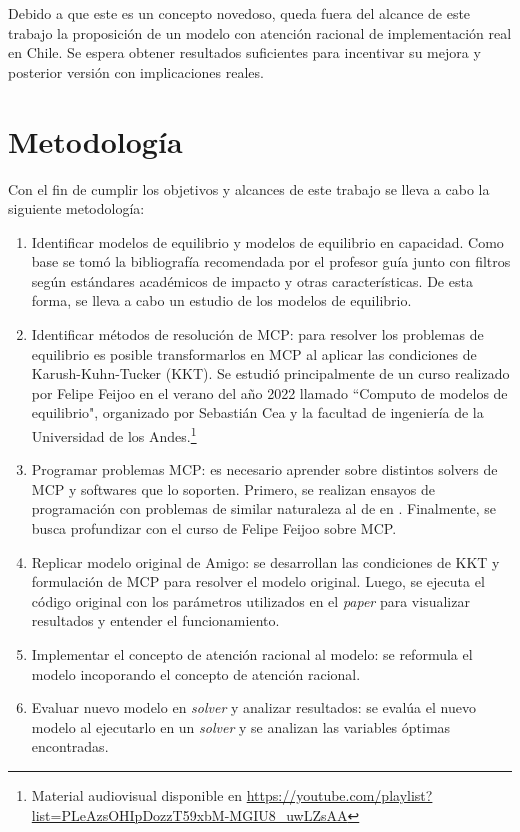 Debido a que este es un concepto novedoso, queda fuera del alcance de este trabajo la proposición de un modelo con atención racional de implementación real en Chile. Se espera obtener resultados suficientes para incentivar su mejora y posterior versión con implicaciones reales.

\section{Metodología}
Con el fin de cumplir los objetivos y alcances de este trabajo se lleva a cabo la siguiente metodología:

\begin{enumerate}
\item Identificar modelos de equilibrio y modelos de equilibrio en capacidad. Como base se tomó la bibliografía recomendada por el profesor guía junto con filtros según estándares académicos de impacto y otras características. De esta forma, se lleva a cabo un estudio de los modelos de equilibrio.

\item Identificar métodos de resolución de MCP: para resolver los problemas de equilibrio es posible transformarlos en MCP al aplicar las condiciones de Karush-Kuhn-Tucker (KKT). Se estudió principalmente de un curso realizado por Felipe Feijoo en el verano del año 2022 llamado ``Computo de modelos de equilibrio", organizado por Sebastián Cea y la facultad de ingeniería de la Universidad de los Andes.\footnote{Material audiovisual disponible en \url{https://youtube.com/playlist?list=PLeAzsOHIpDozzT59xbM-MGIU8_uwLZsAA}}   

\item Programar problemas MCP: es necesario aprender sobre distintos solvers de MCP y softwares que lo soporten. Primero, se realizan ensayos de programación con problemas de similar naturaleza al de  en . Finalmente, se busca profundizar con el curso de Felipe Feijoo sobre MCP. 

\item Replicar modelo original de Amigo: se desarrollan las condiciones de KKT y formulación de MCP para resolver el modelo original. Luego, se ejecuta el código original con los parámetros utilizados en el \textit{paper} para visualizar resultados y entender el funcionamiento.

\item Implementar el concepto de atención racional al modelo: se reformula el modelo incoporando el concepto de atención racional.

\item Evaluar nuevo modelo en \textit{solver} y analizar resultados: se evalúa el nuevo modelo al ejecutarlo en un \textit{solver} y se analizan las variables óptimas encontradas.
\end{enumerate}


